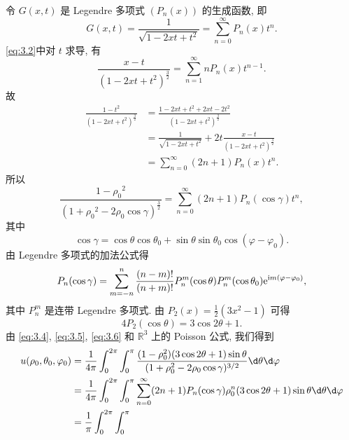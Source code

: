 \begin{solution}
  令 $G(x,t)$ 是 Legendre 多项式 $(P_n(x))$ 的生成函数, 即
  \begin{equation}\label{eq:3.2}
    G(x,t) = \frac{1}{\sqrt{1-2xt+t^2}} = \sum_{n=0}^\infty P_n(x) t^n.
  \end{equation}
  \eqref{eq:3.2}中对 $t$ 求导, 有
  \begin{equation}\label{eq:3.3}
    \frac{x-t}{(1-2xt+t^2)^\frac32} = \sum_{n=1}^\infty n P_n(x) t^{n-1}.
  \end{equation}
  故
  \begin{equation}\label{eq:3.4}
    \begin{aligned}
      \frac{1-t^2}{(1-2xt+t^2)^\frac32}
      & = \frac{1-2xt+t^2+2xt-2t^2}{(1-2xt+t^2)^\frac32} \\
      & = \frac{1}{\sqrt{1-2xt+t^2}} + 2t \frac{x-t}{(1-2xt+t^2)^\frac32} \\
      & = \sum_{n=0}^\infty (2n+1) P_n(x) t^n.
    \end{aligned}
  \end{equation}
  所以
  \[\frac{1-{\rho_0}^2}{(1+{\rho_0}^2-2\rho_0\cos\gamma)^\frac32} = \sum_{n=0}^\infty (2n+1) P_n(\cos\gamma) t^n,\]
  其中
  \[ \cos\gamma = \cos\theta\cos\theta_0 + \sin\theta\sin\theta_0\cos(\varphi-\varphi_0).\]
  由 Legendre 多项式的加法公式得
  \begin{equation}\label{eq:3.5}
    P_n(\cos\gamma) = \sum_{m=-n}^n \frac{(n-m)!}{(n+m)!} P_n^m(\cos\theta)
      P_n^m(\cos\theta_0) \mathrm{e}^{\mathrm{i} m(\varphi-\varphi_0)},
  \end{equation}
  其中 $P_n^m$ 是连带 Legendre 多项式. 由 $\displaystyle P_2(x)=\frac12(3x^2-1)$ 可得
  \begin{equation}\label{eq:3.6}
    4P_2(\cos\theta) = 3\cos2\theta+1.
  \end{equation}
  由 \eqref{eq:3.4}, \eqref{eq:3.5}, \eqref{eq:3.6} 和 $\mathbb{R}^3$ 上的 Poisson 公式,
  我们得到
  \begin{equation}\label{eq:3.7}
    \begin{aligned}
      u(\rho_0,\theta_0,\varphi_0)
      & = \frac{1}{4\pi} \int_0^{2\pi} \int_0^\pi
          \frac{(1-\rho_0^2)(3\cos2\theta+1)\sin\theta}{(1+\rho_0^2-2\rho_0\cos\gamma)^{3/2}}
          \d\theta\d\varphi \\
      & = \frac{1}{4\pi} \int_0^{2\pi} \int_0^\pi
          \sum_{n=0}^\infty (2n+1) P_n(\cos\gamma)\rho_0^n (3\cos2\theta+1) \sin\theta
          \d\theta\d\varphi \\
      & = \frac{1}{\pi} \int_0^{2\pi} \int_0^\pi

\end{aligned}
\end{equation}
\end{solution}
